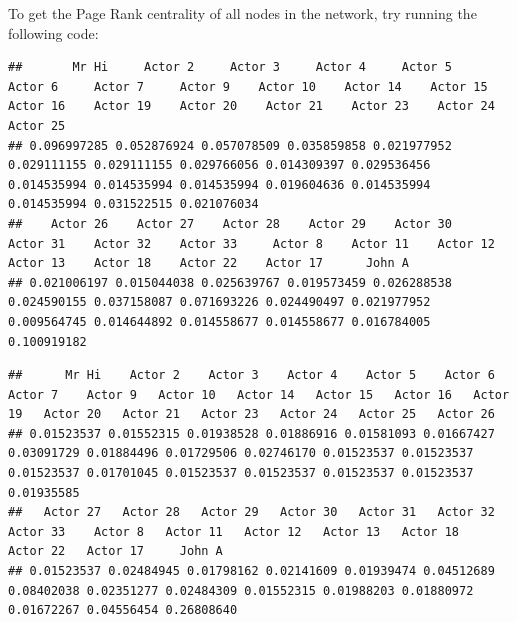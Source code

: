 \documentclass[
]{book}
\newenvironment{Shaded}{\begin{snugshade}}{\end{snugshade}}
\newcommand{\AttributeTok}[1]{\textcolor[rgb]{0.13,0.29,0.53}{#1}}
\newcommand{\CommentTok}[1]{\textcolor[rgb]{0.56,0.35,0.01}{\textit{#1}}}
\newcommand{\ConstantTok}[1]{\textcolor[rgb]{0.56,0.35,0.01}{#1}}
\newcommand{\FunctionTok}[1]{\textcolor[rgb]{0.13,0.29,0.53}{\textbf{#1}}}
\newcommand{\NormalTok}[1]{#1}
\newcommand{\SpecialCharTok}[1]{\textcolor[rgb]{0.81,0.36,0.00}{\textbf{#1}}}
\begin{document}
To get the Page Rank centrality of all nodes in the network, try running the following code:

\begin{Shaded}
\end{Shaded}

\begin{verbatim}
##       Mr Hi     Actor 2     Actor 3     Actor 4     Actor 5     Actor 6     Actor 7     Actor 9    Actor 10    Actor 14    Actor 15    Actor 16    Actor 19    Actor 20    Actor 21    Actor 23    Actor 24    Actor 25 
## 0.096997285 0.052876924 0.057078509 0.035859858 0.021977952 0.029111155 0.029111155 0.029766056 0.014309397 0.029536456 0.014535994 0.014535994 0.014535994 0.019604636 0.014535994 0.014535994 0.031522515 0.021076034 
##    Actor 26    Actor 27    Actor 28    Actor 29    Actor 30    Actor 31    Actor 32    Actor 33     Actor 8    Actor 11    Actor 12    Actor 13    Actor 18    Actor 22    Actor 17      John A 
## 0.021006197 0.015044038 0.025639767 0.019573459 0.026288538 0.024590155 0.037158087 0.071693226 0.024490497 0.021977952 0.009564745 0.014644892 0.014558677 0.014558677 0.016784005 0.100919182
\end{verbatim}

\begin{Shaded}
\end{Shaded}

\begin{verbatim}
##      Mr Hi    Actor 2    Actor 3    Actor 4    Actor 5    Actor 6    Actor 7    Actor 9   Actor 10   Actor 14   Actor 15   Actor 16   Actor 19   Actor 20   Actor 21   Actor 23   Actor 24   Actor 25   Actor 26 
## 0.01523537 0.01552315 0.01938528 0.01886916 0.01581093 0.01667427 0.03091729 0.01884496 0.01729506 0.02746170 0.01523537 0.01523537 0.01523537 0.01701045 0.01523537 0.01523537 0.01523537 0.01523537 0.01935585 
##   Actor 27   Actor 28   Actor 29   Actor 30   Actor 31   Actor 32   Actor 33    Actor 8   Actor 11   Actor 12   Actor 13   Actor 18   Actor 22   Actor 17     John A 
## 0.01523537 0.02484945 0.01798162 0.02141609 0.01939474 0.04512689 0.08402038 0.02351277 0.02484309 0.01552315 0.01988203 0.01880972 0.01672267 0.04556454 0.26808640
\end{verbatim}
\end{document}

